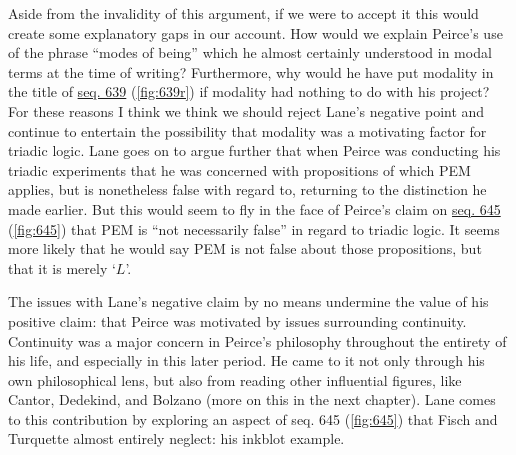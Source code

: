 Aside from the invalidity of this argument, if we were to accept it this would create some explanatory gaps in our account. How would we explain Peirce's use of the phrase ``modes of being'' which he almost certainly understood in modal terms at the time of writing? Furthermore, why would he have put modality in the title of \href{https://iiif.lib.harvard.edu/manifests/view/drs:15255301$639i}{seq. 639} (\ref{fig:639r}) if modality had nothing to do with his project? For these reasons I think we think we should reject Lane's negative point and continue to entertain the possibility that modality was a motivating factor for triadic logic. Lane goes on to argue further that when Peirce was conducting his triadic experiments that he was concerned with propositions of which PEM applies, but is nonetheless false with regard to, returning to the distinction he made earlier. But this would seem to fly in the face of Peirce's claim on \href{https://iiif.lib.harvard.edu/manifests/view/drs:15255301$645i}{seq. 645} (\ref{fig:645}) that PEM is ``not necessarily false'' in regard to triadic logic. It seems more likely that he would say PEM is not false about those propositions, but that it is merely `$L$'.

 The issues with Lane's negative claim by no means undermine the value of his positive claim: that Peirce was motivated by issues surrounding continuity. Continuity was a major concern in Peirce's philosophy throughout the entirety of his life, and especially in this later period. He came to it not only through his own philosophical lens, but also from reading other influential figures, like Cantor,  Dedekind, and Bolzano (more on this in the next chapter). Lane comes to this contribution by exploring an aspect of seq. 645 (\ref{fig:645}) that Fisch and Turquette almost entirely neglect: his inkblot example.
 
